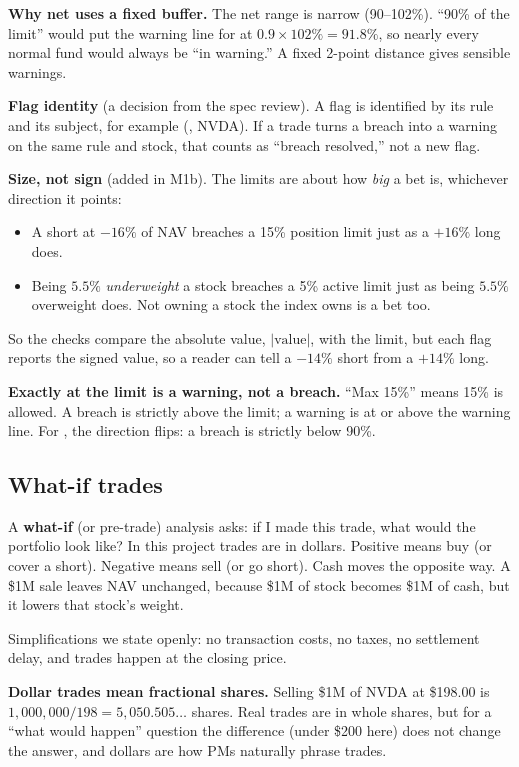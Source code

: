 \documentclass[11pt]{article}
\newcommand{\code}[1]{\texttt{\detokenize{#1}}}
\begin{document}
\textbf{Why net uses a fixed buffer.} The net range is narrow (90--102\%). ``90\% of the
limit'' would put the warning line for \code{max_net} at $0.9 \times 102\% = 91.8\%$, so
nearly every normal fund would always be ``in warning.'' A fixed 2-point distance gives
sensible warnings.

\textbf{Flag identity} (a decision from the spec review). A flag is identified by its rule and its
subject, for example (\code{max_position}, NVDA). If a trade turns a breach into a warning on
the same rule and stock, that counts as ``breach resolved,'' not a new flag.

\textbf{Size, not sign} (added in M1b). The \code{max_*} limits are about how \emph{big} a bet
is, whichever direction it points:
\begin{itemize}
  \item A short at $-16\%$ of NAV breaches a 15\% position limit just as a $+16\%$ long does.
  \item Being $5.5\%$ \emph{underweight} a stock breaches a 5\% active limit just as being
        $5.5\%$ overweight does. Not owning a stock the index owns is a bet too.
\end{itemize}
So the checks compare the absolute value, $|\text{value}|$, with the limit, but each flag
reports the signed value, so a reader can tell a $-14\%$ short from a $+14\%$ long.

\textbf{Exactly at the limit is a warning, not a breach.} ``Max 15\%'' means 15\% is allowed.
A breach is strictly above the limit; a warning is at or above the warning line. For
\code{min_net}, the direction flips: a breach is strictly below 90\%.

\subsection{What-if trades}

A \textbf{what-if} (or pre-trade) analysis asks: if I made this trade, what would the
portfolio look like? In this project trades are in dollars. Positive means buy (or cover a
short). Negative means sell (or go short). Cash moves the opposite way. A \$1M sale leaves NAV
unchanged, because \$1M of stock becomes \$1M of cash, but it lowers that stock's weight.

Simplifications we state openly: no transaction costs, no taxes, no settlement delay, and
trades happen at the closing price.

\textbf{Dollar trades mean fractional shares.} Selling \$1M of NVDA at \$198.00 is
$1{,}000{,}000 / 198 = 5{,}050.505\ldots$ shares. Real trades are in whole shares, but for a
``what would happen'' question the difference (under \$200 here) does not change the answer,
and dollars are how PMs naturally phrase trades.
\end{document}
